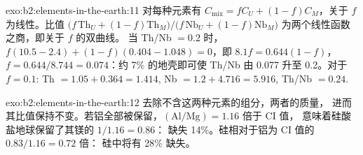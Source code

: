 \begin{solution}{exo:b2:elements-in-the-earth:11}
对每种元素有 $C_{\mathrm{mix}} = fC_U + (1-f)C_M$，关于 $f$ 为线性。比值
$\bigl(f\,\mathrm{Th}_U + (1-f)\mathrm{Th}_M\bigr)/\bigl(f\,\mathrm{Nb}_U +
(1-f)\mathrm{Nb}_M\bigr)$ 为两个线性函数之商，即关于 $f$ 的双曲线。
当 Th/Nb $= 0.2$ 时，$f(10.5-2.4) + (1-f)(0.404-1.048) = 0$，即 $8.1f = 0.644(1-f)$，
$f = 0.644/8.744 = 0.074$：约 7\% 的地壳即可使 Th/Nb 由 0.077 升至 0.2。对于
$f = 0.1$: Th $= 1.05 + 0.364 = 1.414$, Nb $= 1.2 + 4.716 = 5.916$, Th/Nb $= 0.24$.
\end{solution}

\begin{solution}{exo:b2:elements-in-the-earth:12}
去除不含这两种元素的组分，两者的质量，
进而其比值保持不变。若铝全部被保留，$(\mathrm{Al}/\mathrm{Mg}) = 1.16$ 倍于 CI 值，
意味着硅酸盐地球保留了其镁的 $1/1.16 = 0.86$：
缺失 14\%。硅相对于铝为 CI 值的 $0.83/1.16 = 0.72$ 倍：
硅中将有 28\% 缺失。
\end{solution}

